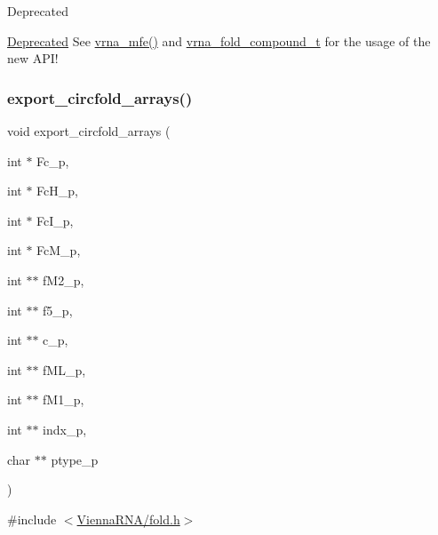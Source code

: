 \begin{DoxyRefDesc}{Deprecated}
\item[\hyperlink{deprecated__deprecated000073}{Deprecated}]See \hyperlink{group__mfe__global_gabd3b147371ccf25c577f88bbbaf159fd}{vrna\+\_\+mfe()} and \hyperlink{group__fold__compound_ga1b0cef17fd40466cef5968eaeeff6166}{vrna\+\_\+fold\+\_\+compound\+\_\+t} for the usage of the new A\+P\+I!\end{DoxyRefDesc}
\mbox{\label{group__mfe__global__deprecated_ga04d5d639fd4473ca766436a9bae5665c}} 
\subsubsection{\texorpdfstring{export\+\_\+circfold\+\_\+arrays()}{export\_circfold\_arrays()}}
{\footnotesize\ttfamily void export\+\_\+circfold\+\_\+arrays (\begin{DoxyParamCaption}\item[{int $\ast$}]{Fc\+\_\+p,  }\item[{int $\ast$}]{Fc\+H\+\_\+p,  }\item[{int $\ast$}]{Fc\+I\+\_\+p,  }\item[{int $\ast$}]{Fc\+M\+\_\+p,  }\item[{int $\ast$$\ast$}]{f\+M2\+\_\+p,  }\item[{int $\ast$$\ast$}]{f5\+\_\+p,  }\item[{int $\ast$$\ast$}]{c\+\_\+p,  }\item[{int $\ast$$\ast$}]{f\+M\+L\+\_\+p,  }\item[{int $\ast$$\ast$}]{f\+M1\+\_\+p,  }\item[{int $\ast$$\ast$}]{indx\+\_\+p,  }\item[{char $\ast$$\ast$}]{ptype\+\_\+p }\end{DoxyParamCaption})}



{\ttfamily \#include $<$\hyperlink{fold_8h}{Vienna\+R\+N\+A/fold.\+h}$>$}

